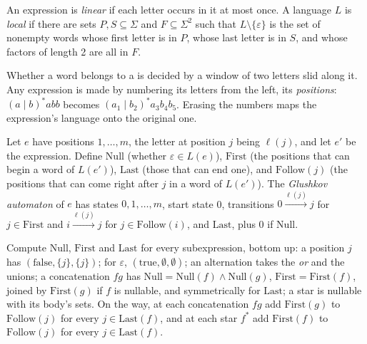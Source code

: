 \begin{definition}\label{def:b2:regular-languages:local}
An expression is \emph{linear} if each letter occurs in it at most once. A language
$L$ is \emph{local} if there are sets $P, S \subseteq \Sigma$ and $F \subseteq \Sigma^2$ such
that $L \setminus \{\varepsilon\}$ is the set of nonempty words whose first letter is in $P$, whose last letter is in
$S$, and whose factors of length 2 are all in $F$.
\end{definition}

Whether a word belongs to a  is decided by a window of two letters slid along it. Any expression is made
 by numbering its letters from the left, its \emph{positions}: $(a \mid b)^*abb$ becomes $(a_1 \mid b_2)^* a_3
b_4 b_5$. Erasing the numbers maps the  expression's language onto the original one.

\begin{definition}\label{def:b2:regular-languages:glushkov}
Let $e$ have positions $1, \dots, m$, the letter at position $j$ being $\ell(j)$, and let $e'$ be the 
expression. Define $\mathrm{Null}$ (whether $\varepsilon \in L(e)$), $\mathrm{First}$ (the positions that can begin a
word of $L(e')$), $\mathrm{Last}$ (those that can end one), and $\mathrm{Follow}(j)$ (the positions that can come right
after $j$ in a word of $L(e')$). The \emph{Glushkov automaton} of $e$ has states $0, 1,
\dots, m$, start state 0, transitions $0 \xrightarrow{\ell(j)} j$ for $j \in \mathrm{First}$ and $i \xrightarrow{\ell(j)}
j$ for $j \in \mathrm{Follow}(i)$, and  $\mathrm{Last}$, plus 0 if $\mathrm{Null}$.
\end{definition}

\begin{method}\label{met:b2:regular-languages:berry-sethi}
Compute $\mathrm{Null}$, $\mathrm{First}$ and $\mathrm{Last}$ for every subexpression, bottom up: a position $j$ has
$(\mathrm{false}, \{j\}, \{j\})$; for $\varepsilon$, $(\mathrm{true}, \emptyset, \emptyset)$; an alternation takes the
\emph{or} and the unions; a concatenation $fg$ has $\mathrm{Null} = \mathrm{Null}(f) \wedge \mathrm{Null}(g)$,
$\mathrm{First} = \mathrm{First}(f)$, joined by $\mathrm{First}(g)$ if $f$ is nullable, and symmetrically for
$\mathrm{Last}$; a star is nullable with its body's sets. On the way, at each concatenation $fg$ add
$\mathrm{First}(g)$ to $\mathrm{Follow}(j)$ for every $j \in \mathrm{Last}(f)$, and at each star $f^*$ add
$\mathrm{First}(f)$ to $\mathrm{Follow}(j)$ for every $j \in \mathrm{Last}(f)$.
\end{method}

